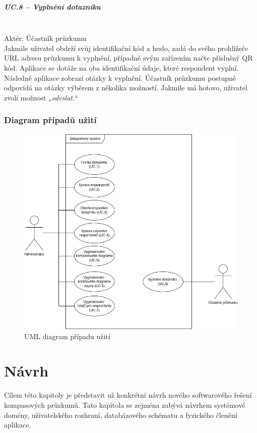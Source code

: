 \paragraph{UC.8 – Vyplnění dotazníku}~\\
Aktér: Účastník průzkumu~\\
Jakmile uživatel obdrží svůj identifikační kód a heslo, zadá do svého prohlížeče URL adresu průzkumu k vyplnění, případně svým zařízením načte příslušný QR kód. Aplikace se dotáže na oba identifikační údaje, které respondent vyplní. Následně aplikace zobrazí otázky k vyplnění. Účastník průzkumu postupně odpovídá na otázky výběrem z několika možností. Jakmile má hotovo, uživatel zvolí možnost \textit{„odeslat.“}

\subsection{Diagram případů užití}
\begin{figure}[h!]
    \centering
    \includegraphics[width=\textwidth]{images/UCDiagram.png}
    \caption{UML diagram případu užití}
    \label{fig:umlusecase}
\end{figure}

\chapter{Návrh}
Cílem této kapitoly je představit už konkrétní návrh nového softwarového řešení kompasových průzkumů.
Tato kapitola se zejména zabývá návrhem systémové domény, uživatelského rozhraní, databázového schématu a fyzického členění aplikace.

